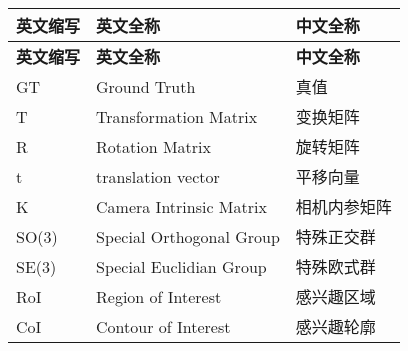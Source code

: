 \cleardoublepage
{}
\begin{center}
    \begin{longtable}{m{2cm}m{8cm}m{5cm}}
        \toprule
        \textbf{英文缩写}&\textbf{英文全称}&\textbf{中文全称}\\
        \midrule
        \endfirsthead
        \toprule
        \textbf{英文缩写}&\textbf{英文全称}&\textbf{中文全称}\\
        \midrule
        \endhead 
        \bottomrule
        \endfoot
        \bottomrule
        \endlastfoot
        GT&Ground Truth&真值\\
        T&Transformation Matrix&变换矩阵\\
        R&Rotation Matrix&旋转矩阵\\
        t&translation vector&平移向量\\
        K&Camera Intrinsic Matrix&相机内参矩阵\\
        SO(3)&Special Orthogonal Group&特殊正交群\\
        SE(3)&Special Euclidian Group&特殊欧式群\\
        RoI&Region of Interest&感兴趣区域\\
        CoI&Contour of Interest&感兴趣轮廓\\

	\end{longtable}
\end{center}